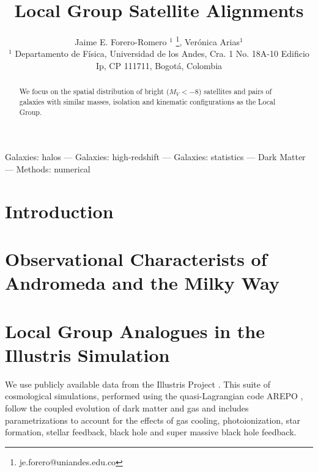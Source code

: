 \documentclass[useAMS,usenatbib,usegraphicx]{mn2e}
\begin{document}
\title[LG satellite alignments]{Local Group Satellite Alignments}
\author[J.E. Forero-Romero \& V. Arias]
{Jaime E. Forero-Romero $^{1}$ \thanks{je.forero@uniandes.edu.co},
Ver\'onica Arias$^1$\\
$^1$ Departamento de F\'isica, Universidad de los Andes, Cra. 1
  No. 18A-10 Edificio Ip, CP 111711, Bogot\'a, Colombia \\
}

\maketitle

\begin{abstract}
We focus on the spatial distribution of bright ($M_V<-8$) satellites and
pairs of galaxies with similar masses, isolation and kinematic
configurations as the Local Group. 
\end{abstract}

\begin{keywords}Galaxies: halos --- Galaxies: high-redshift --- Galaxies: statistics
--- Dark Matter --- Methods: numerical 
\end{keywords}

\section{Introduction}

\section{Observational Characterists of Andromeda and the Milky Way}
\label{sec:obs}


\section{Local Group Analogues in the Illustris Simulation}
\label{sec:NumericalSetup}

We use publicly available data from the Illustris Project 
\citep{2014MNRAS.444.1518V}. 
This suite of cosmological simulations, performed using the quasi-Lagrangian
code AREPO \citep{2010MNRAS.401..791S}, follow the coupled evolution of dark 
matter and gas and includes parametrizations to account for the effects of
gas cooling, photoionization, star formation, stellar feedback, black
hole and super massive black hole feedback. 
\end{document}
